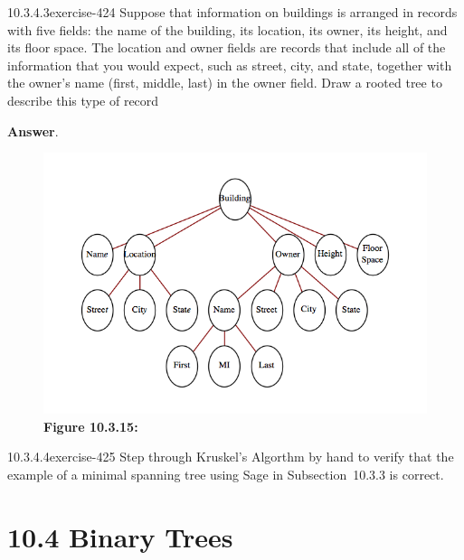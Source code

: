 \documentclass[twoside,10pt,]{book}
\numberwithin{equation}{section}
\begin{document}
\begin{divisionsolution}{10.3.4.3}{}{exercise-424}%
\hypertarget{p-3649}{}%
Suppose that information on buildings is arranged in records with five fields: the name of the building, its location, its owner, its height, and its floor space. The location and owner fields are records that include all of the information that you would expect, such as street, city, and state, together with the owner's name (first, middle, last) in the owner field. Draw a rooted tree to describe this type of record%
\par\smallskip%
\noindent\textbf{Answer}.\quad%
\leavevmode%
\begin{figure}
\centering
\includegraphics[width=1\linewidth]{images/fig-solution-10-3-3.png}
\caption*{\textbf{Figure 10.3.15:} }
\end{figure}
\end{divisionsolution}%
\begin{divisionsolution}{10.3.4.4}{}{exercise-425}%
\hypertarget{p-3650}{}%
Step through Kruskel's Algorthm by hand to verify that the example of a minimal spanning tree using Sage in Subsection~10.3.3 is correct.%
\end{divisionsolution}%
\section*{10.4 Binary Trees}
\end{document}
